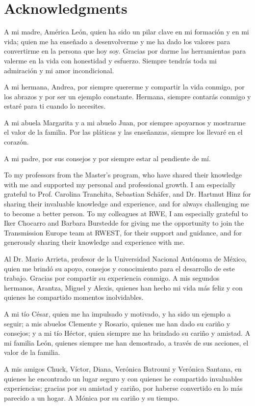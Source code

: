 \chapter*{Acknowledgments}

A mi madre, América León, quien ha sido un pilar clave en mi formación y en mi vida; quien me ha enseñado a desenvolverme y me ha dado los valores para convertirme en la persona que hoy soy. Gracias por darme las herramientas para valerme en la vida con honestidad y esfuerzo. Siempre tendrás toda mi admiración y mi amor incondicional.

A mi hermana, Andrea, por siempre quererme y compartir la vida conmigo, por los abrazos y por ser un ejemplo constante. Hermana, siempre contarás conmigo y estaré para ti cuando lo necesites.

A mi abuela Margarita y a mi abuelo Juan, por siempre apoyarnos y mostrarme el valor de la familia. Por las pláticas y las enseñanzas, siempre los llevaré en el corazón.

A mi padre, por sus consejos y por siempre estar al pendiente de mí.

To my professors from the Master’s program, who have shared their knowledge with me and supported my personal and professional growth. I am especially grateful to Prof. Carolina Tranchita, Sebastian Schäfer, and Dr. Hartmut Hinz for sharing their invaluable knowledge and experience, and for always challenging me to become a better person.
To my colleagues at RWE, I am especially grateful to Iker Chocarro and Barbara Burstedde for giving me the opportunity to join the Transmission Europe team at RWEST, for their support and guidance, and for generously sharing their knowledge and experience with me.

Al Dr. Mario Arrieta, profesor de la Universidad Nacional Autónoma de México, quien me brindó su apoyo, consejos y conocimiento para el desarrollo  de este trabajo. Gracias por compartir su experiencia conmigo. 
A mis segundos hermanos, Arantza, Miguel y Alexis, quienes han hecho mi vida más feliz y con quienes he compartido momentos inolvidables.

A mi tío César, quien me ha impulsado y motivado, y ha sido un ejemplo a seguir; a mis abuelos Clemente y Rosario, quienes me han dado su cariño y consejos; y a mi tío Héctor, quien siempre me ha brindado su cariño y amistad. A mi familia León, quienes siempre me han demostrado, a través de sus acciones, el valor de la familia.

A mis amigos Chuck, Víctor, Diana, Verónica Batrouni y Verónica Santana, en quienes he encontrado un lugar seguro y con quienes he compartido invaluables experiencias; gracias por su amistad y cariño, por haberse convertido en lo más parecido a un hogar. A Mónica por su cariño y su tiempo. 

